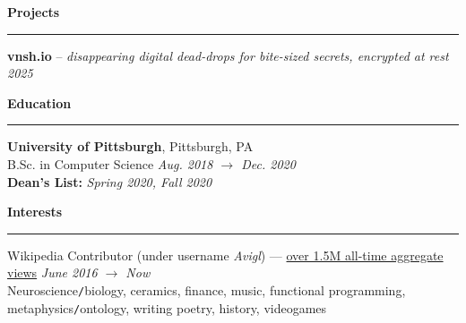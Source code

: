 \documentclass[10pt]{article}
\begin{document}
\begin{flushleft}
		\vspace{1.5mm}
		{\large \raggedright \textbf{Projects}}
		\vspace{1.25mm}

    \hrule 

    \vspace{2.25mm}
    \textbf{vnsh.io} -- \textit{disappearing digital dead-drops for bite-sized secrets, encrypted at rest} \hfill \textit{\small 2025}

		\vspace{1.5mm}
		{\large \raggedright \textbf{Education}}
		\vspace{1.25mm}
	
		\hrule
		
		\vspace{2.25mm}
		\textbf{University of Pittsburgh}, Pittsburgh, PA\\
      	{\small B.Sc. in Computer Science \hfill \textit{Aug. 2018 $\rightarrow$ Dec. 2020}}\\
		{\small \textbf{Dean's List:} \textit{Spring 2020, Fall 2020}}\\

		\vspace{1.25mm}
		{\large \raggedright \textbf{Interests}}
		\vspace{1.25mm}
	
		\hrule
	
		\vspace{2.25mm}
		Wikipedia Contributor (under username \textit{Avigl}) --- \href{https://pageviews.wmcloud.org/?project=en.wikipedia.org&platform=all-access&agent=user&redirects=0&range=all-time&pages=Timeline_of_social_media|Timeline_of_online_advertising|Timeline_of_e-commerce|Screening_Partnership_Program|Silicon_Valley_Education_Foundation|Chicago_Community_Trust}{over 1.5M all-time aggregate views} \hfill \textit{\small June 2016 $\rightarrow$ Now}\\
		Neuroscience\texttt{/}biology, ceramics, finance, music, functional programming, metaphysics\texttt{/}ontology, writing poetry, history, videogames
	\end{flushleft}
\end{document}

